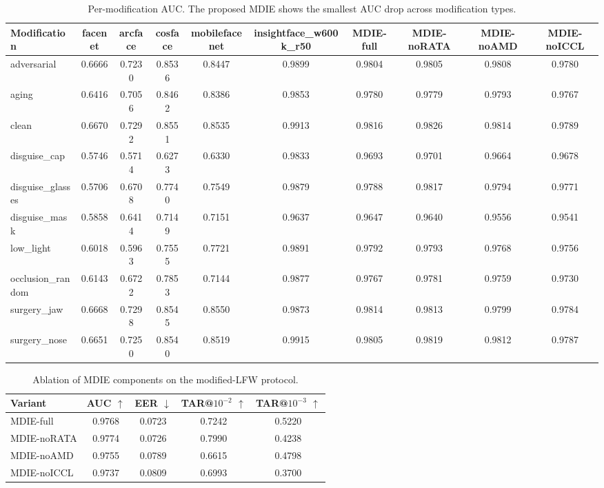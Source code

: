 \begin{table}[t]
\centering
\caption{Per-modification AUC. The proposed MDIE shows the smallest AUC drop across modification types.}
\label{tab:permod}
\begin{tabular}{lccccccccc}
\hline
Modification & facenet & arcface & cosface & mobilefacenet & insightface_w600k_r50 & MDIE-full & MDIE-noRATA & MDIE-noAMD & MDIE-noICCL \\
\hline
adversarial & 0.6666 & 0.7230 & 0.8536 & 0.8447 & 0.9899 & 0.9804 & 0.9805 & 0.9808 & 0.9780 \\
aging & 0.6416 & 0.7056 & 0.8462 & 0.8386 & 0.9853 & 0.9780 & 0.9779 & 0.9793 & 0.9767 \\
clean & 0.6670 & 0.7292 & 0.8551 & 0.8535 & 0.9913 & 0.9816 & 0.9826 & 0.9814 & 0.9789 \\
disguise_cap & 0.5746 & 0.5714 & 0.6273 & 0.6330 & 0.9833 & 0.9693 & 0.9701 & 0.9664 & 0.9678 \\
disguise_glasses & 0.5706 & 0.6708 & 0.7740 & 0.7549 & 0.9879 & 0.9788 & 0.9817 & 0.9794 & 0.9771 \\
disguise_mask & 0.5858 & 0.6414 & 0.7149 & 0.7151 & 0.9637 & 0.9647 & 0.9640 & 0.9556 & 0.9541 \\
low_light & 0.6018 & 0.5963 & 0.7555 & 0.7721 & 0.9891 & 0.9792 & 0.9793 & 0.9768 & 0.9756 \\
occlusion_random & 0.6143 & 0.6722 & 0.7853 & 0.7144 & 0.9877 & 0.9767 & 0.9781 & 0.9759 & 0.9730 \\
surgery_jaw & 0.6668 & 0.7298 & 0.8545 & 0.8550 & 0.9873 & 0.9814 & 0.9813 & 0.9799 & 0.9784 \\
surgery_nose & 0.6651 & 0.7250 & 0.8540 & 0.8519 & 0.9915 & 0.9805 & 0.9819 & 0.9812 & 0.9787 \\
\hline
\end{tabular}
\end{table}

\begin{table}[t]
\centering
\caption{Ablation of MDIE components on the modified-LFW protocol.}
\label{tab:ablation}
\begin{tabular}{lcccc}
\hline
Variant & AUC $\uparrow$ & EER $\downarrow$ & TAR@$10^{-2}$ $\uparrow$ & TAR@$10^{-3}$ $\uparrow$ \\
\hline
MDIE-full & 0.9768 & 0.0723 & 0.7242 & 0.5220 \\
MDIE-noRATA & 0.9774 & 0.0726 & 0.7990 & 0.4238 \\
MDIE-noAMD & 0.9755 & 0.0789 & 0.6615 & 0.4798 \\
MDIE-noICCL & 0.9737 & 0.0809 & 0.6993 & 0.3700 \\
\hline
\end{tabular}
\end{table}
